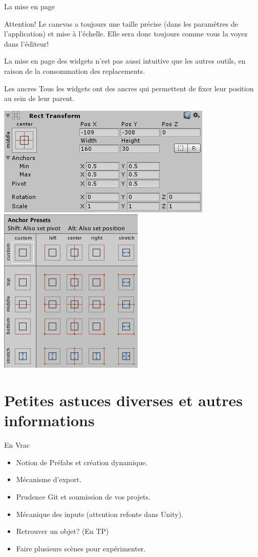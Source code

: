 \begin{frame}{La mise en page}
	\begin{alertblock}{Attention!}
Le canevas a toujours une taille précise (dans les paramètres de l'application) et mise à l'échelle. Elle sera donc toujours comme vous la voyez dans l'éditeur!

La mise en page des widgets n'est pas aussi intuitive que les autres outils, en raison de la consommation des replacements.
		
	\end{alertblock}

\begin{block}{Les ancres}
	Tous les widgets ont des ancres qui permettent de fixer leur position au sein de leur parent. 
\end{block}

\hfill
	\includegraphics[width=0.45\linewidth]{../../imgs/UI_RectTransform}
\hfill
	\includegraphics[width=0.25\linewidth]{../../imgs/UI_AnchorPreset}
\hfill


\end{frame}

\section{Petites astuces diverses et autres informations}

\begin{frame}{En Vrac}
\begin{itemize}
	\item Notion de Préfabs et création dynamique.
	\item Mécanisme d'export.
	\item Prudence Git et soumission de vos projets.
	\item Mécanique des inputs (attention refonte dans Unity).
	\item Retrouver un objet? (En TP)
	\item Faire plusieurs scènes pour expérimenter.
\end{itemize}
\end{frame}


  
